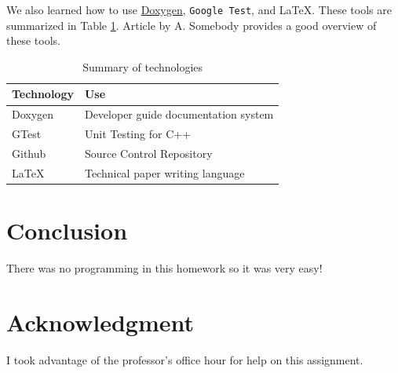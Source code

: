 \documentclass[%
]{IEEEtran}
\begin{document}
We also learned how to use \href{http://doxygen.nl/manual/docblocks.html}{Doxygen}, \texttt{Google Test}, and \LaTeX.  These tools are summarized in Table \ref{t:techs}.
Article by A. Somebody provides a good overview \cite{somebody} of these tools.

\begin{table}[t]
\centering
\caption{Summary of technologies}
\label{t:techs}
\begin{tabular}{l|l}
\textbf{Technology} & \textbf{Use}\\ %
\hline
Doxygen & Developer guide documentation system \\
GTest & Unit Testing for C++ \\
Github & Source Control Repository \\
LaTeX & Technical paper writing language
\end{tabular}
\end{table}

\section{Conclusion}
There was no programming in this homework so it was very easy!

\section*{Acknowledgment}
I took advantage of the professor's office hour for help on this assignment.



\end{document}
